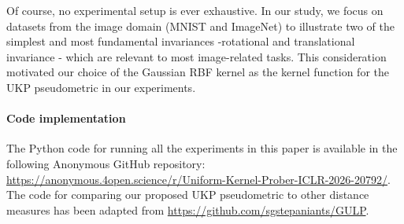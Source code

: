 \documentclass{article} %
\newcommand{\metricstname}{UKP }
\theoremstyle{plain}
\begin{document}
Of course, no experimental setup is ever exhaustive. In our study, we focus on datasets from the image domain (MNIST and ImageNet) to illustrate two of the simplest and most fundamental invariances -rotational and translational invariance - which are relevant to most image-related tasks. This consideration motivated our choice of the Gaussian RBF kernel as the kernel function for the \metricstname pseudometric in our experiments.

\paragraph{Code implementation} The Python code for running all the experiments in this paper is available in the following Anonymous GitHub repository: \url{https://anonymous.4open.science/r/Uniform-Kernel-Prober-ICLR-2026-20792/}. The code for comparing our proposed \metricstname pseudometric to other distance measures has been adapted from \url{https://github.com/sgstepaniants/GULP}. 
\end{document}
